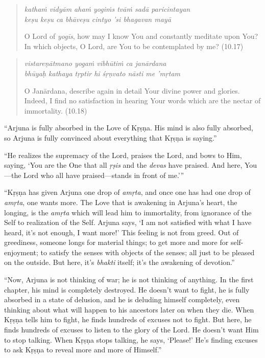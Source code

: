 \documentclass[12pt, twoside, openright]{memoir}
\begin{document}
\par
\begin{verse}
\textit{kathaṁ vidyām ahaṁ yogiṁs tvāṁ sadā paricintayan} \\
\textit{keṣu keṣu ca bhāveṣu cintyo ’si bhagavan mayā}

\noindent O Lord of \textit{yogīs}, how may I know You and constantly meditate upon You? In which objects, O Lord, are You to be contemplated by me? (10.17)
\end{verse}
\par



\par
\begin{verse}
\textit{vistareṇātmano yogaṁ vibhūtiṁ ca janārdana} \\
\textit{bhūyaḥ kathaya tṛptir hi śṛṇvato nāsti me ’mṛtam}

\noindent O Janārdana, describe again in detail Your divine power and glories. Indeed, I find no satisfaction in hearing Your words which are the nectar of immortality. (10.18)
\end{verse}
\par




\enquote{Arjuna is fully absorbed in the Love of Kṛṣṇa. His mind is also fully absorbed, so Arjuna is fully convinced about everything that Kṛṣṇa is saying.}

\enquote{He realizes the supremacy of the Lord, praises the Lord, and bows to Him, saying, \enquote{You are the One that all \textit{ṛṣis} and the \textit{devas} have praised. And here, You---the Lord who all have praised---stands in front of me.}}

\enquote{Kṛṣṇa has given Arjuna one drop of \textit{amṛta}, and once one has had one drop of \textit{amṛta}, one wants more. The Love that is awakening in Arjuna’s heart, the longing, is the \textit{amṛta} which will lead him to immortality, from ignorance of the Self to realization of the Self. Arjuna says, \enquote{I am not satisfied with what I have heard, it’s not enough, I want more!} This feeling is not from greed. Out of greediness, someone longs for material things; to get more and more for self-enjoyment; to satisfy the senses with objects of the senses; all just to be pleased on the outside. But here, it’s \textit{bhakti} itself; it’s the awakening of devotion.}

\enquote{Now, Arjuna is not thinking of war; he is not thinking of anything. In the first chapter, his mind is completely destroyed. He doesn’t want to fight, he is fully absorbed in a state of delusion, and he is deluding himself completely, even thinking about what will happen to his ancestors later on when they die. When Kṛṣṇa tells him to fight, he finds hundreds of excuses not to fight. But here, he finds hundreds of excuses to listen to the glory of the Lord. He doesn’t want Him to stop talking. When Kṛṣṇa stops talking, he says, \enquote{Please!} He’s finding excuses to ask Kṛṣṇa to reveal more and more of Himself.}
\end{document}
